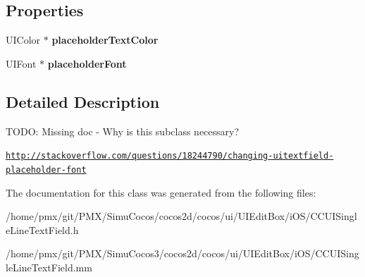 \subsection*{Properties}
\begin{DoxyCompactItemize}
\item 
\mbox{\label{interfaceCCUISingleLineTextField_af7c166daa6ed806896cc545ba60c2406}} 
U\+I\+Color $\ast$ {\bfseries placeholder\+Text\+Color}
\item 
\mbox{\label{interfaceCCUISingleLineTextField_a200eb8d7569ee5ddf29766a2921c83dd}} 
U\+I\+Font $\ast$ {\bfseries placeholder\+Font}
\end{DoxyCompactItemize}


\subsection{Detailed Description}
T\+O\+DO\+: Missing doc -\/ Why is this subclass necessary?

\href{http://stackoverflow.com/questions/18244790/changing-uitextfield-placeholder-font}{\tt http\+://stackoverflow.\+com/questions/18244790/changing-\/uitextfield-\/placeholder-\/font} 

The documentation for this class was generated from the following files\+:\begin{DoxyCompactItemize}
\item 
/home/pmx/git/\+P\+M\+X/\+Simu\+Cocos/cocos2d/cocos/ui/\+U\+I\+Edit\+Box/i\+O\+S/C\+C\+U\+I\+Single\+Line\+Text\+Field.\+h\item 
/home/pmx/git/\+P\+M\+X/\+Simu\+Cocos3/cocos2d/cocos/ui/\+U\+I\+Edit\+Box/i\+O\+S/C\+C\+U\+I\+Single\+Line\+Text\+Field.\+mm\end{DoxyCompactItemize}
